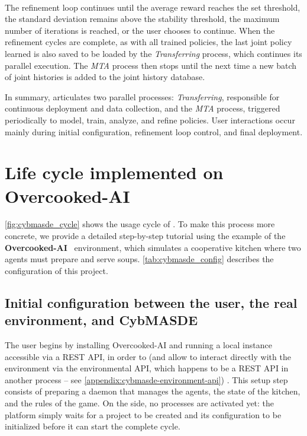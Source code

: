 \

The refinement loop continues until the average reward reaches the set threshold, the standard deviation remains above the stability threshold, the maximum number of iterations is reached, or the user chooses to continue. When the refinement cycles are complete, as with all trained policies, the last joint policy learned is also saved to be loaded by the \textit{Transferring} process, which continues its parallel execution. The \textit{MTA} process then stops until the next time a new batch of joint histories is added to the joint history database.


\medskip
In summary,  articulates two parallel processes: \textit{Transferring}, responsible for continuous deployment and data collection, and the \textit{MTA} process, triggered periodically to model, train, analyze, and refine policies.
User interactions occur mainly during initial configuration, refinement loop control, and final deployment.

\section{Life cycle implemented on Overcooked-AI}

\autoref{fig:cybmasde_cycle} shows the usage cycle of .
To make this process more concrete, we provide a detailed step-by-step tutorial using the example of the \textbf{Overcooked-AI}~\cite{overcookedai} environment, which simulates a cooperative kitchen where two agents must prepare and serve soups. \autoref {tab:cybmasde_config} describes the configuration of this project.


\subsection{Initial configuration between the user, the real environment, and CybMASDE}

The user begins by installing Overcooked-AI and running a local instance accessible via a REST API, in order to  (and allow  to interact directly with the environment via the environmental API, which happens to be a REST API in another process -- see \autoref{appendix:cybmasde-environment-api}) . This setup step consists of preparing a daemon that manages the agents, the state of the kitchen, and the rules of the game. On the  side, no processes are activated yet: the platform simply waits for a project to be created and its configuration to be initialized before it can start the complete cycle.

